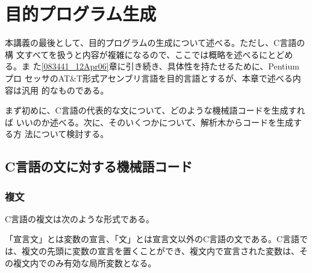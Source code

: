 
\chapter{目的プログラム生成}

本講義の最後として、目的プログラムの生成について述べる。ただし、C言語の構
文すべてを扱うと内容が複雑になるので、ここでは概略を述べるにとどめる。ま
た\ref{083441_12Apr06}章に引き続き、具体性を持たせるために、Pentium プロ
セッサのAT\&T形式アセンブリ言語を目的言語とするが、本章で述べる内容は汎用
的なものである。


まず初めに、C言語の代表的な文について、どのような機械語コードを生成すれば
いいのか述べる。次に、そのいくつかについて、解析木からコードを生成する方
法について検討する。

\section{C言語の文に対する機械語コード}

\subsection{複文}

C言語の複文は次のような形式である。
\begin{quote}
\end{quote}
「宣言文」とは変数の宣言、「文」とは宣言文以外のC言語の文である。C言語で
は、複文の先頭に変数の宣言を置くことができ、複文内で宣言された変数は、そ
の複文内でのみ有効な局所変数となる。

